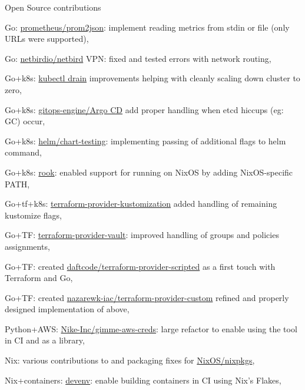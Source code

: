 \begin{cventries}
    \cventry
    {Open Source contributions} %
    {} %
    {} %
    {} %
    {
        \begin{cvitems} %
            \item {Go: \href{https://github.com/prometheus/prom2json/pull/35}{prometheus/prom2json}: implement reading metrics from stdin or file (only URLs were supported),}
            \item {Go: \href{https://github.com/netbirdio/netbird/pull/612}{netbirdio/netbird} VPN: fixed and tested errors with network routing,}
            \item {Go+k8s: \href{https://github.com/kubernetes/kubernetes/pull/109361}{kubectl drain} improvements helping with cleanly scaling down cluster to zero,}
            \item {Go+k8s: \href{https://github.com/argoproj/gitops-engine/pull/461}{gitops-engine/Argo CD} add proper handling when etcd hiccups (eg: GC) occur,}
            \item {Go+k8s: \href{https://github.com/helm/chart-testing/pull/396}{helm/chart-testing}: implementing passing of additional flags to helm command,}
            \item {Go+k8s: \href{https://github.com/rook/rook/pull/9967}{rook}: enabled support for running on NixOS by adding NixOS-specific PATH,}
            \item {Go+tf+k8s: \href{https://github.com/kbst/terraform-provider-kustomization/pull/220}{terraform-provider-kustomization} added handling of remaining kustomize flags, }
            \item {Go+TF: \href{https://github.com/hashicorp/terraform-provider-vault/pull/321}{terraform-provider-vault}: improved handling of groups and policies assignments,}
            \item {Go+TF: created \href{https://github.com/daftcode/terraform-provider-scripted}{daftcode/terraform-provider-scripted} as a first touch with Terraform and Go,}
            \item {Go+TF: created \href{https://github.com/nazarewk-iac/terraform-provider-custom}{nazarewk-iac/terraform-provider-custom} refined and properly designed implementation of above,}
            \item {Python+AWS: \href{https://github.com/Nike-Inc/gimme-aws-creds/pull/119}{Nike-Inc/gimme-aws-creds}: large refactor to enable using the tool in CI and as a library,}
            \item {Nix: various contributions to and packaging fixes for \href{https://github.com/NixOS/nixpkgs}{NixOS/nixpkgs},}
            \item {Nix+containers: \href{https://github.com/cachix/devenv/pull/503}{devenv}: enable building containers in CI using Nix's Flakes,}
        \end{cvitems}
    }

\end{cventries}
